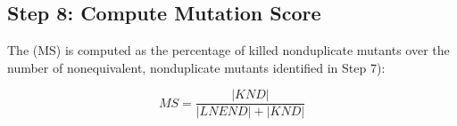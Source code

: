 %
%

\subsection{Step 8: Compute Mutation Score}
\label{sec:appr:score}


The  (MS) is computed as the percentage of killed nonduplicate mutants 
over the number of nonequivalent, nonduplicate mutants identified in Step 7):

\begin{equation}
\label{equation:ms}
\mathit{MS} = \frac{|\mathit{KND}|}{|\mathit{LNEND}|+|\mathit{KND}|}
\end{equation}
%
%
%
